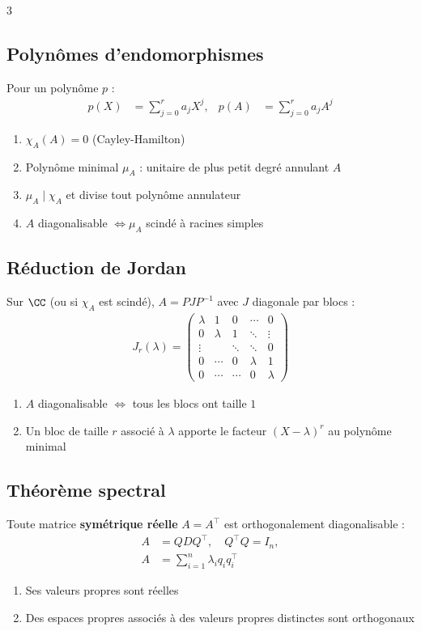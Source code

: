 \documentclass[12pt, a4paper]{article}
\begin{document}
\begin{multicols*}{3}
\subsection{Polynômes d'endomorphismes}
Pour un polynôme $p$ :
\begin{align*}
p(X)&=\sum_{j=0}^r a_jX^j, &p(A)&=\sum_{j=0}^r a_jA^j
\end{align*}
\begin{enumerate}
\item $\chi_A(A)=0$ \hfill(Cayley-Hamilton)
\item Polynôme minimal $\mu_A$ : unitaire de plus petit degré annulant $A$
\item $\mu_A\mid\chi_A$ et divise tout polynôme annulateur
\item $A$ diagonalisable $\iff\mu_A$ scindé à racines simples
\end{enumerate}

\subsection{Réduction de Jordan}
Sur $\CC$ (ou si $\chi_A$ est scindé), $A=PJP^{-1}$ avec $J$ diagonale par blocs :
\begin{align*}
J_r(\lambda)=\begin{pmatrix}
\lambda&1&0&\cdots&0\\
0&\lambda&1&\ddots&\vdots\\
\vdots&&\ddots&\ddots&0\\
0&\cdots&0&\lambda&1\\
0&\cdots&\cdots&0&\lambda
\end{pmatrix}
\end{align*}
\begin{enumerate}
\item $A$ diagonalisable $\iff$ tous les blocs ont taille $1$
\item Un bloc de taille $r$ associé à $\lambda$ apporte le facteur $(X-\lambda)^r$ au polynôme minimal
\end{enumerate}

\subsection{Théorème spectral}
Toute matrice \textbf{symétrique réelle} $A=A^\top$ est orthogonalement diagonalisable :
\begin{align*}
A&=QDQ^\top,\quad Q^\top Q=I_n,\\
A&=\sum_{i=1}^n\lambda_i q_iq_i^\top
\end{align*}
\begin{enumerate}
\item Ses valeurs propres sont réelles
\item Des espaces propres associés à des valeurs propres distinctes sont orthogonaux
\end{enumerate}


\end{multicols*}
\end{document}
